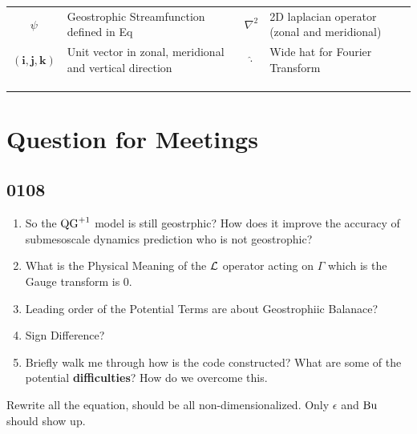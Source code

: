 \documentclass{article}
\begin{document}
\begin{tabularx}{\textwidth}{@{} c X c X @{}}
$\psi$& Geostrophic Streamfunction defined in Eq& $\nabla^2$& 2D laplacian operator (zonal and meridional) \\
\addlinespace[10pt]

$(\bm{i}, \bm{j}, \bm{k})$& Unit vector in zonal, meridional and vertical direction& $\widehat{\cdot}$& Wide hat for Fourier Transform \\
\addlinespace[10pt]

&&& \\
\addlinespace[10pt]

&&& \\
\addlinespace[10pt]

\end{tabularx}

\section{Question for Meetings}

\subsection{0108}

\begin{enumerate}
	\item So the $\text{QG}^{+1}$ model is still geostrphic? How does it improve the accuracy of submesoscale dynamics prediction who is not geostrophic?
	\item What is the Physical Meaning of the $\mathcal{L}$ operator acting on $\Gamma$ which is the Gauge transform is 0. 
	\item Leading order of the Potential Terms are about Geostrophiic Balanace?
	\item Sign Difference?
	\item Briefly walk me through how is the code constructed? What are some of the potential \textbf{difficulties}? How do we overcome this. 
\end{enumerate}

Rewrite all the equation, should be all non-dimensionalized. Only $\epsilon$ and $\text{Bu}$ should show up. 
\newpage


\newpage


\newpage


\newpage



\nocite{*}
\vfill


\end{document}
